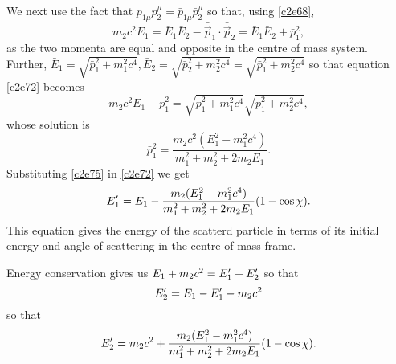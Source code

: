 \begin{enumerate}
We next use the fact that $p_{1\mu}p_2^\mu = \bar{p}_{1\mu}\bar{p}_2^\mu$ so that,
using \eqref{c2e68},
\begin{equation}\label{c2e73}
m_2c^2E_1 = \bar{E}_1\bar{E}_2 - \bar{\vec{p}}_1\cdot\bar{\vec{p}}_2 = 
\bar{E}_1\bar{E}_2 + \bar{p}_1^2,
\end{equation}
as the two momenta are equal and opposite in the centre of mass system. Further, 
$\bar{E}_1 = \sqrt{\bar{p}_1^2 + m_1^2c^4}, \bar{E}_2 = \sqrt{\bar{p}_2^2 + m_2^2c^4}
= \sqrt{\bar{p}_1^2 + m_2^2c^4}$ so that equation \eqref{c2e72} becomes
\begin{equation}\label{c2e74}
m_2c^2E_1 - \bar{p}_1^2 = \sqrt{\bar{p}_1^2 + m_1^2c^4}\sqrt{\bar{p}_1^2 + m_2^2c^4},
\end{equation}
whose solution is
\begin{equation}\label{c2e75}
\bar{p}_1^2 = \frac{m_2c^2(E_1^2 - m_1^2c^4)}{m_1^2 + m_2^2 + 2m_2E_1}.
\end{equation}
Substituting \eqref{c2e75} in \eqref{c2e72} we get
\begin{equation}\label{c2e76}
E_1^\prime = E_1 - \frac{m_2(E_1^2 - m_1^2c^4)}{m_1^2 + m_2^2 + 2m_2E_1}(1 - \cos\chi).
\end{equation}
This equation gives the energy of the scatterd particle in terms of its initial
energy and angle of scattering in the centre of mass frame.

Energy conservation gives us $E_1 + m_2c^2 = E_1^\prime + E_2^\prime$ so that
\[
E_2^\prime = E_1 - E_1^\prime - m_2c^2
\]
so that
\begin{equation}\label{c2e77}
E_2^\prime = m_2c^2 + \frac{m_2(E_1^2 - m_1^2c^4)}{m_1^2 + m_2^2 + 2m_2E_1}(1 - \cos\chi).
\end{equation}


\end{enumerate}
